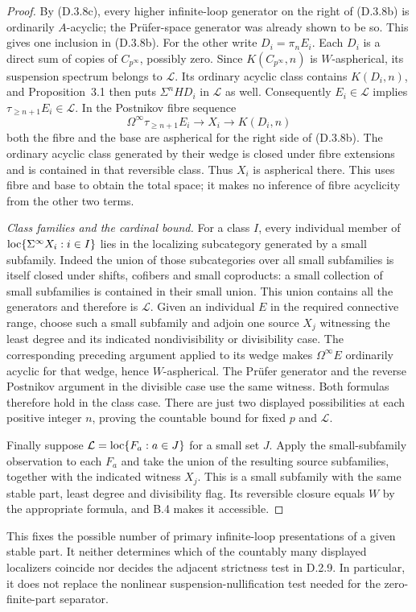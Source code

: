 \begin{proof}
By (D.3.8c), every higher infinite-loop generator on the right
of (D.3.8b) is ordinarily $A$-acyclic; the Prüfer-space
generator was already shown to be so. This gives one inclusion
in (D.3.8b). For the other write $D_i=\pi_nE_i$.
Each $D_i$ is a direct sum of copies of $C_{p^\infty}$,
possibly zero. Since $K(C_{p^\infty},n)$ is $W$-aspherical,
its suspension spectrum belongs to $\mathcal L$.
Its ordinary acyclic class contains $K(D_i,n)$, and
Proposition~3.1 then puts $\Sigma^nHD_i$ in $\mathcal L$ as well.
Consequently $E_i\in\mathcal L$ implies
$\tau_{\geq n+1}E_i\in\mathcal L$.
In the Postnikov fibre sequence
\[
 \Omega^\infty\tau_{\geq n+1}E_i
          \longrightarrow X_i\longrightarrow K(D_i,n)
\]
both the fibre and the base are aspherical for the right side of
(D.3.8b). The ordinary acyclic class generated by their wedge
is closed under fibre extensions and is contained in that
reversible class. Thus $X_i$ is aspherical there. This uses
fibre and base to obtain the total space; it makes no inference
of fibre acyclicity from the other two terms.

\medskip\noindent
\emph{Class families and the cardinal bound.}
For a class $I$, every individual member of
$\operatorname{loc}\{\Sigma^\infty X_i:i\in I\}$ lies in the localizing
subcategory generated by a small subfamily. Indeed the union
of those subcategories over all small subfamilies is itself
closed under shifts, cofibers and small coproducts: a small
collection of small subfamilies is contained in their small
union. This union contains all the generators and therefore
is $\mathcal L$. Given an individual $E$ in the required
connective range, choose such a small subfamily and adjoin one
source $X_j$ witnessing the least degree and its indicated
nondivisibility or divisibility case. The corresponding
preceding argument applied to its wedge makes
$\Omega^\infty E$ ordinarily acyclic for that wedge, hence
$W$-aspherical. The Prüfer generator and the reverse Postnikov
argument in the divisible case use the same witness. Both
formulas therefore hold in the class case. There are just two
displayed possibilities at each positive integer $n$, proving
the countable bound for fixed $p$ and $\mathcal L$.

Finally suppose $\mathcal L=\operatorname{loc}\{F_a:a\in J\}$ for a small
set $J$. Apply the small-subfamily observation to each $F_a$
and take the union of the resulting source subfamilies,
together with the indicated witness $X_j$. This is a small
subfamily with the same stable part, least degree and
divisibility flag. Its reversible closure equals $W$ by the
appropriate formula, and B.4 makes it accessible.
\end{proof}

This fixes the possible number of primary infinite-loop
presentations of a given stable part. It neither determines
which of the countably many displayed localizers coincide nor
decides the adjacent strictness test in D.2.9. In particular,
it does not replace the nonlinear suspension-nullification
test needed for the zero-finite-part separator.
